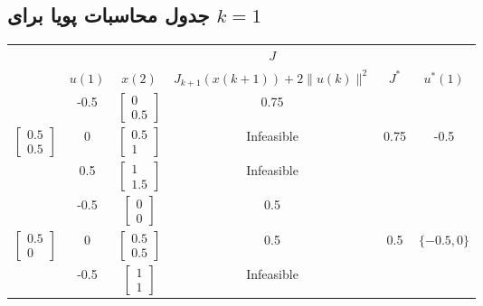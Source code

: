 \documentclass[14pt, a4paper]{extarticle}
\begin{document}
	\subsection*{جدول محاسبات پویا برای \( k = 1 \)}
\begin{latin}
	\begin{longtable}{|c|c|c|c|c|c|}
		\hline
		\rowcolor[HTML]{00D2CB} 
		 & 	 & 	 & $J$ &	 &	\\
		\rowcolor[HTML]{00D2CB} 
		\multirow{-2}{*}{$x(1)$}	&\multirow{-2}{*}{$u(1)$ }	&\multirow{-2}{*}{$x(2)$}	& $J_{k+1}(x(k+1)) + 2\|u(k)\|^2$ &\multirow{-2}{*}{$J^*$}	& \multirow{-2}{*}{$u^*(1)$}\\ \hline
		\endfirsthead                                                 
		\endhead
			&-0.5&$\begin{bmatrix} 0 \\ 0.5 \end{bmatrix}$&0.75&	&	\\  \cline{2-4} 
		\multirow{-3}{*}{$\begin{bmatrix} 0.5 \\ 0.5 \end{bmatrix}$}&0&$\begin{bmatrix} 0.5 \\ 1 \end{bmatrix}$&Infeasible&0.75&-0.5	\\  \cline{2-4} 		
			&0.5&$\begin{bmatrix} 1 \\ 1.5 \end{bmatrix}$&Infeasible&	&	\\  \cline{2-4} \hline
			
			&      -0.5                  &$\begin{bmatrix} 0 \\ 0 \end{bmatrix}$      &     0.5 &             &   \\  \cline{2-4} 
		\multirow{-3}{*}{$\begin{bmatrix} 0.5 \\ 0 \end{bmatrix}$}&        0                &$\begin{bmatrix} 0.5 \\ 0.5 \end{bmatrix}$      &      0.5                  &    0.5     &  $\{-0.5,0\}$   \\  \cline{2-4} 
			&         -0.5               &$\begin{bmatrix} 1 \\ 1 \end{bmatrix}$      & Infeasible                        &              &   \\  \cline{2-4} \hline
			

\end{longtable}
\end{latin}
\end{document}

